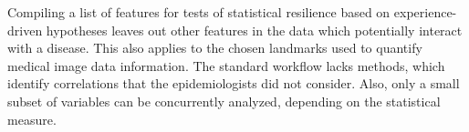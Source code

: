 \documentclass[journal]{style/vgtc} 			          %
\begin{document}
Compiling a list of features for tests of statistical resilience based on experience-driven hypotheses leaves out other features in the data which potentially interact with a disease.
%
This also applies to the chosen landmarks used to quantify medical image data information.
%
The standard workflow lacks methods, which identify correlations that the epidemiologists did not consider.
%
Also, only a small subset of variables can be concurrently analyzed, depending on the statistical measure.
%
%
%
%
\\\\
\end{document}
